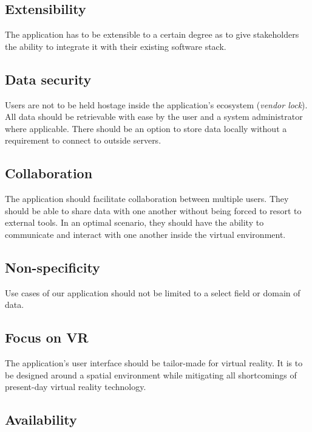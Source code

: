 \documentclass[thesis=M,english,hidelinks]{FITthesisXE}[2012/06/26]
\begin{document}
\subsection{Extensibility}

The application has to be extensible to a certain degree as to give stakeholders the ability to integrate it with their existing software stack.

\subsection{Data security}

Users are not to be held hostage inside the application's ecosystem (\emph{vendor lock}). All data should be retrievable with ease by the user and a system administrator where applicable. There should be an option to store data locally without a requirement to connect to outside servers.

\subsection{Collaboration}

The application should facilitate collaboration between multiple users. They should be able to share data with one another without being forced to resort to external tools. In an optimal scenario, they should have the ability to communicate and interact with one another inside the virtual environment.

\subsection{Non-specificity}

Use cases of our application should not be limited to a select field or domain of data.

\subsection{Focus on VR}

The application's user interface should be tailor-made for virtual reality. It is to be designed around a spatial environment while mitigating all shortcomings of present-day virtual reality technology.

\subsection{Availability}
\end{document}
